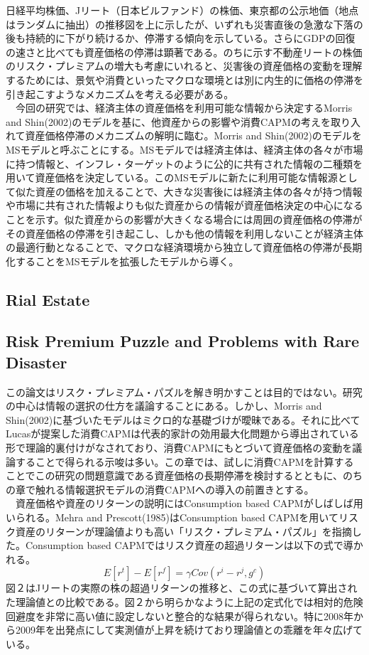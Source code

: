 \documentclass{jsarticle}
\begin{document}
日経平均株価、Jリート（日本ビルファンド）の株価、東京都の公示地価（地点はランダムに抽出）の推移図を上に示したが、いずれも災害直後の急激な下落の後も持続的に下がり続けるか、停滞する傾向を示している。さらにGDPの回復の速さと比べても資産価格の停滞は顕著である。のちに示す不動産リートの株価のリスク・プレミアムの増大も考慮にいれると、災害後の資産価格の変動を理解するためには、景気や消費といったマクロな環境とは別に内生的に価格の停滞を引き起こすようなメカニズムを考える必要がある。\\
　今回の研究では、経済主体の資産価格を利用可能な情報から決定するMorris and Shin(2002)のモデルを基に、他資産からの影響や消費CAPMの考えを取り入れて資産価格停滞のメカニズムの解明に臨む。Morris and Shin(2002)のモデルをMSモデルと呼ぶことにする。MSモデルでは経済主体は、経済主体の各々が市場に持つ情報と、インフレ・ターゲットのように公的に共有された情報の二種類を用いて資産価格を決定している。このMSモデルに新たに利用可能な情報源として似た資産の価格を加えることで、大きな災害後には経済主体の各々が持つ情報や市場に共有された情報よりも似た資産からの情報が資産価格決定の中心になることを示す。似た資産からの影響が大きくなる場合には周囲の資産価格の停滞がその資産価格の停滞を引き起こし、しかも他の情報を利用しないことが経済主体の最適行動となることで、マクロな経済環境から独立して資産価格の停滞が長期化することをMSモデルを拡張したモデルから導く。

\subsection{Rial Estate}

\subsection{Risk Premium Puzzle and Problems with Rare Disaster}
この論文はリスク・プレミアム・パズルを解き明かすことは目的ではない。研究の中心は情報の選択の仕方を議論することにある。しかし、Morris and Shin(2002)に基づいたモデルはミクロ的な基礎づけが曖昧である。それに比べてLucasが提案した消費CAPMは代表的家計の効用最大化問題から導出されている形で理論的裏付けがなされており、消費CAPMにもとづいて資産価格の変動を議論することで得られる示唆は多い。この章では、試しに消費CAPMを計算することでこの研究の問題意識である資産価格の長期停滞を検討するとともに、のちの章で触れる情報選択モデルの消費CAPMへの導入の前置きとする。\\
　資産価格や資産のリターンの説明にはConsumption based CAPMがしばしば用いられる。Mehra and Prescott(1985)はConsumption based CAPMを用いてリスク資産のリターンが理論値よりも高い「リスク・プレミアム・パズル」を指摘した。Consumption based CAPMではリスク資産の超過リターンは以下の式で導かれる。
$$E[r^{t}] - E[r^{f}] = \gamma Cov(r^{i} - r^{j}, g^{c})$$
図２はJリートの実際の株の超過リターンの推移と、この式に基づいて算出された理論値との比較である。図２から明らかなように上記の定式化では相対的危険回避度を非常に高い値に設定しないと整合的な結果が得られない。特に2008年から2009年を出発点にして実測値が上昇を続けており理論値との乖離を年々広げている。\\
\end{document}
